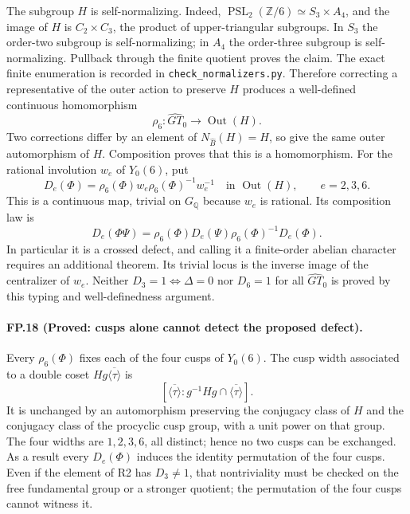 The subgroup $H$ is self-normalizing. Indeed,
$\operatorname{PSL}_2(\mathbb Z/6)\simeq S_3\times A_4$, and the image
of $H$ is $C_2\times C_3$, the product of upper-triangular subgroups.
In $S_3$ the order-two subgroup is self-normalizing; in $A_4$ the
order-three subgroup is self-normalizing. Pullback through the finite
quotient proves the claim. The exact finite enumeration is recorded in
\texttt{check\_normalizers.py}.
Therefore correcting a representative of the outer action to preserve
$H$ produces a well-defined continuous homomorphism
\[
 \rho_6:\widehat{GT}_0\longrightarrow\operatorname{Out}(H).
\]
Two corrections differ by an element of $N_{\widehat B}(H)=H$, so give
the same outer automorphism of $H$. Composition proves that this is a
homomorphism.
For the rational involution $w_e$ of $Y_0(6)$, put
\[
 D_e(\Phi)=\rho_6(\Phi)w_e\rho_6(\Phi)^{-1}w_e^{-1}
 \quad\text{in }\operatorname{Out}(H),\qquad e=2,3,6.
\]
This is a continuous map, trivial on $G_{\mathbb Q}$ because $w_e$ is
rational. Its composition law is
\[
 D_e(\Phi\Psi)=
 \rho_6(\Phi)D_e(\Psi)\rho_6(\Phi)^{-1}D_e(\Phi).
\]
In particular it is a crossed defect, and calling it a finite-order
abelian character requires an additional theorem. Its trivial locus is
the inverse image of the centralizer of $w_e$. Neither
$D_3=1\Longleftrightarrow\Delta=0$ nor $D_6=1$ for all
$\widehat{GT}_0$ is proved by this typing and well-definedness argument.

\paragraph{FP.18 (Proved: cusps alone cannot detect the proposed defect).}
Every $\rho_6(\Phi)$ fixes each of the four cusps of $Y_0(6)$.
The cusp width associated to a double coset
$H g\overline{\langle\tau\rangle}$ is
\[
 [\overline{\langle\tau\rangle}:
  g^{-1}Hg\cap\overline{\langle\tau\rangle}].
\]
It is unchanged by an automorphism preserving the conjugacy class of $H$
and the conjugacy class of the procyclic cusp group, with a unit power on
that group. The four widths are $1,2,3,6$, all distinct; hence no two
cusps can be exchanged. As a result every $D_e(\Phi)$ induces the identity
permutation of the four cusps. Even if the element of R2 has
$D_3\ne1$, that nontriviality must be checked on the free fundamental
group or a stronger quotient; the permutation of the four cusps cannot
witness it.

